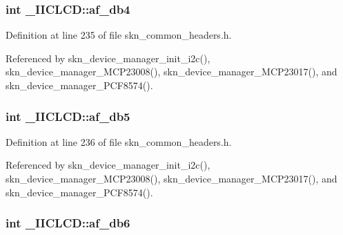 \hypertarget{struct___i_i_c_l_c_d_adbfc88b661d5da527aad6f5bcd45a85c}{}
\subsubsection[{af\+\_\+db4}]{\setlength{\rightskip}{0pt plus 5cm}int \+\_\+\+I\+I\+C\+L\+C\+D\+::af\+\_\+db4}\label{struct___i_i_c_l_c_d_adbfc88b661d5da527aad6f5bcd45a85c}


Definition at line 235 of file skn\+\_\+common\+\_\+headers.\+h.



Referenced by skn\+\_\+device\+\_\+manager\+\_\+init\+\_\+i2c(), skn\+\_\+device\+\_\+manager\+\_\+\+M\+C\+P23008(), skn\+\_\+device\+\_\+manager\+\_\+\+M\+C\+P23017(), and skn\+\_\+device\+\_\+manager\+\_\+\+P\+C\+F8574().

\hypertarget{struct___i_i_c_l_c_d_a41c4536106493476b52c9a9df9dd8599}{}
\subsubsection[{af\+\_\+db5}]{\setlength{\rightskip}{0pt plus 5cm}int \+\_\+\+I\+I\+C\+L\+C\+D\+::af\+\_\+db5}\label{struct___i_i_c_l_c_d_a41c4536106493476b52c9a9df9dd8599}


Definition at line 236 of file skn\+\_\+common\+\_\+headers.\+h.



Referenced by skn\+\_\+device\+\_\+manager\+\_\+init\+\_\+i2c(), skn\+\_\+device\+\_\+manager\+\_\+\+M\+C\+P23008(), skn\+\_\+device\+\_\+manager\+\_\+\+M\+C\+P23017(), and skn\+\_\+device\+\_\+manager\+\_\+\+P\+C\+F8574().

\hypertarget{struct___i_i_c_l_c_d_a0f3ebbe756ecf62494733287f64821f9}{}
\subsubsection[{af\+\_\+db6}]{\setlength{\rightskip}{0pt plus 5cm}int \+\_\+\+I\+I\+C\+L\+C\+D\+::af\+\_\+db6}\label{struct___i_i_c_l_c_d_a0f3ebbe756ecf62494733287f64821f9}


